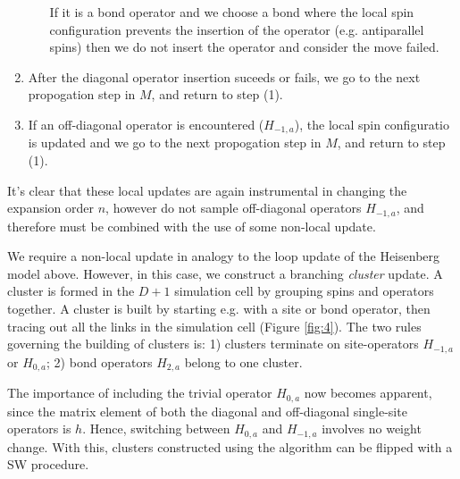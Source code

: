 \documentclass[vecphys]{svmult}
\begin{document}
\begin{enumerate}
\begin{enumerate}
If it is a bond operator and we choose a bond where the local spin configuration prevents the insertion of the operator (e.g. antiparallel spins) then we do not insert the operator and consider the move failed.
\end{enumerate}
\item After the diagonal operator insertion suceeds or fails, we go to the next propogation step in $M$, and return to step (1).
\item If an off-diagonal operator is encountered ($H_{-1,a}$), the local spin configuratio is updated and we go to the next propogation step in $M$, and return to step (1).
\end{enumerate}
It's clear that these local updates are again instrumental in changing the expansion order $n$, however do not sample off-diagonal operators $H_{-1,a}$, and therefore must be combined with the use of some non-local update.

We require a non-local update in analogy to the loop update of the Heisenberg model above.  However, in this case, we construct a branching {\it cluster} update.  A cluster is formed in the $D+1$ simulation cell by grouping spins and operators together.  A cluster is built by starting e.g. with a site or bond operator, then tracing out all the links in the simulation cell (Figure \ref{fig:4}).  The two rules governing the building of clusters is: 1) clusters terminate on site-operators $H_{-1,a}$ or $H_{0,a}$; 2) bond operators $H_{2,a}$ belong to one cluster.

The importance of including the trivial operator $H_{0,a}$ now becomes apparent, since the matrix element of both the diagonal and off-diagonal single-site operators is $h$.  Hence, switching between $H_{0,a}$ and $H_{-1,a}$ involves no weight change.  With this, clusters constructed using the algorithm can be flipped with a SW procedure.  
\end{document}
